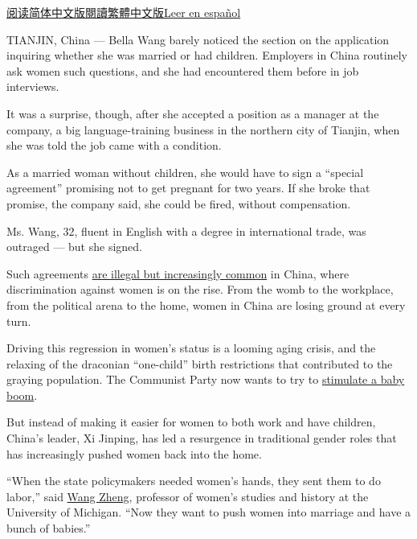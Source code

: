 \href{https://cn.nytimes3xbfgragh.onion/china/20190717/china-women-discrimination/}{阅读简体中文版}\href{https://cn.nytimes3xbfgragh.onion/china/20190717/china-women-discrimination/zh-hant/}{閱讀繁體中文版}\href{https://www.nytimes3xbfgragh.onion/es/2019/07/21/china-discriminacion-genero-mujeres}{Leer
en español}

TIANJIN, China --- Bella Wang barely noticed the section on the
application inquiring whether she was married or had children. Employers
in China routinely ask women such questions, and she had encountered
them before in job interviews.

It was a surprise, though, after she accepted a position as a manager at
the company, a big language-training business in the northern city of
Tianjin, when she was told the job came with a condition.

As a married woman without children, she would have to sign a ``special
agreement'' promising not to get pregnant for two years. If she broke
that promise, the company said, she could be fired, without
compensation.

Ms. Wang, 32, fluent in English with a degree in international trade,
was outraged --- but she signed.

Such agreements
\href{https://www.nytimes3xbfgragh.onion/2019/02/21/world/china-gender-discrimination-workplace.html?searchResultPosition=5}{are
illegal but increasingly common} in China, where discrimination against
women is on the rise. From the womb to the workplace, from the political
arena to the home, women in China are losing ground at every turn.

Driving this regression in women's status is a looming aging crisis, and
the relaxing of the draconian ``one-child'' birth restrictions that
contributed to the graying population. The Communist Party now wants to
try to
\href{https://www.nytimes3xbfgragh.onion/2018/08/11/world/asia/china-one-child-policy-birthrate.html}{stimulate
a baby boom}.

But instead of making it easier for women to both work and have
children, China's leader, Xi Jinping, has led a resurgence in
traditional gender roles that has increasingly pushed women back into
the home.

``When the state policymakers needed women's hands, they sent them to do
labor,'' said \href{https://irwg.umich.edu/people/wang-zheng}{Wang
Zheng}, professor of women's studies and history at the University of
Michigan. ``Now they want to push women into marriage and have a bunch
of babies.''

